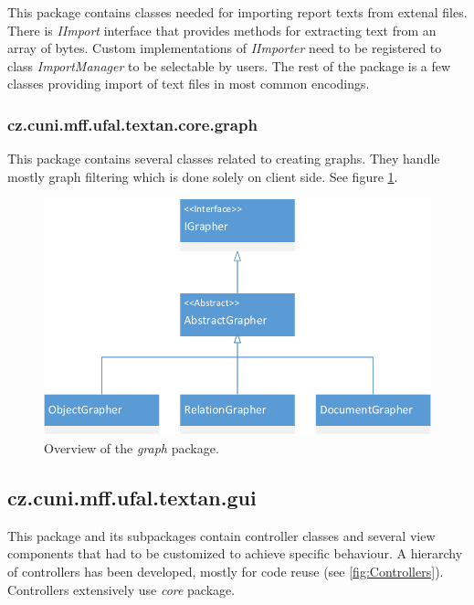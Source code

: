 This package contains classes needed for importing report texts from extenal
files. There is \emph{IImport} interface that provides methods for extracting
text from an array of bytes. Custom implementations of \emph{IImporter} need
to be registered to class \emph{ImportManager} to be selectable by users. The
rest of the package is a few classes providing import of text files in most
common encodings.

\subsubsection{cz.cuni.mff.ufal.textan.core.graph}

This package contains several classes related to creating graphs. They handle
mostly graph filtering which is done solely on client side. See figure
\ref{fig:Graph}.

\begin{figure}[!htb]
        \centering
        \includegraphics[width=\textwidth]{Images/Graph}
        \caption{Overview of the \emph{graph} package.}
        \label{fig:Graph}
\end{figure}

\subsection{cz.cuni.mff.ufal.textan.gui}

This package and its subpackages contain controller classes and several view
components that had to be customized to achieve specific behaviour. A hierarchy
of controllers has been developed, mostly for code reuse (see
\ref{fig:Controllers}). Controllers extensively use \emph{core} package.

